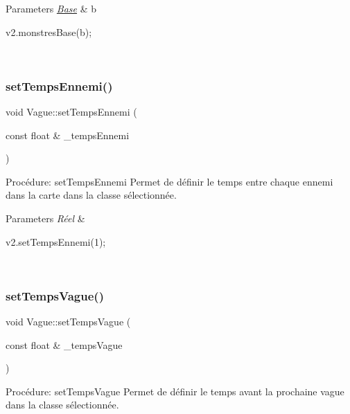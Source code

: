 \begin{DoxyParams}{Parameters}
{\em \hyperlink{classBase}{Base}} & b 
\begin{DoxyCode}
v2.monstresBase(b);
\end{DoxyCode}
 \\
\hline
\end{DoxyParams}
\mbox{\label{classVague_ae9e45cad0c4a4da804f749e03952545c}} 
\subsubsection{\texorpdfstring{set\+Temps\+Ennemi()}{setTempsEnnemi()}}
{\footnotesize\ttfamily void Vague\+::set\+Temps\+Ennemi (\begin{DoxyParamCaption}\item[{const float \&}]{\+\_\+temps\+Ennemi }\end{DoxyParamCaption})}



Procédure\+: set\+Temps\+Ennemi Permet de définir le temps entre chaque ennemi dans la carte dans la classe sélectionnée. 


\begin{DoxyParams}{Parameters}
{\em Réel} & 
\begin{DoxyCode}
v2.setTempsEnnemi(1);
\end{DoxyCode}
 \\
\hline
\end{DoxyParams}
\mbox{\label{classVague_a3c9775c8351b1581afba79c0fd87171a}} 
\subsubsection{\texorpdfstring{set\+Temps\+Vague()}{setTempsVague()}}
{\footnotesize\ttfamily void Vague\+::set\+Temps\+Vague (\begin{DoxyParamCaption}\item[{const float \&}]{\+\_\+temps\+Vague }\end{DoxyParamCaption})}



Procédure\+: set\+Temps\+Vague Permet de définir le temps avant la prochaine vague dans la classe sélectionnée. 


